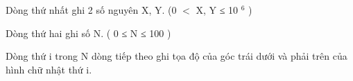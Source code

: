 Dòng thứ nhất ghi 2 số nguyên X, Y. (0 $<$ X, Y ≤ 10   $^    6   $   )  

   Dòng thứ hai ghi số N. ( 0 ≤ N ≤ 100 )  

   Dòng thứ i trong N dòng tiếp theo ghi tọa độ của góc trái dưới và phải trên của hình chữ nhật thứ i.